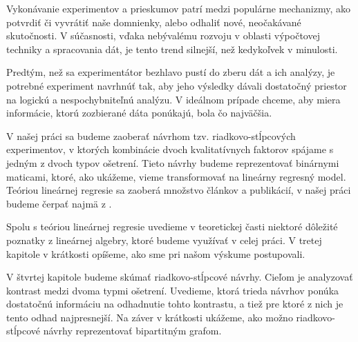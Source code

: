 Vykonávanie experimentov a prieskumov patrí medzi populárne mechanizmy, ako potvrdiť či vyvrátiť naše domnienky, alebo odhaliť nové, neočakávané skutočnosti. 
V súčasnosti, vďaka nebývalému rozvoju v oblasti výpočtovej techniky a spracovania dát, je tento trend silnejší, než kedykoľvek v minulosti.

Predtým, než sa experimentátor bezhlavo pustí do zberu dát a ich analýzy, je potrebné experiment navrhnúť tak, aby jeho výsledky dávali dostatočný priestor na 
logickú a nespochybniteľnú analýzu. V ideálnom prípade chceme, aby miera informácie, ktorú zozbierané dáta ponúkajú, bola čo najväčšia.

V našej práci sa budeme zaoberať návrhom tzv. riadkovo-stĺpcových experimentov, v ktorých kombinácie dvoch kvalitatívnych faktorov spájame s jedným z dvoch typov ošetrení. 
Tieto návrhy budeme reprezentovať binárnymi maticami, ktoré, ako ukážeme, vieme transformovať na lineárny regresný model. 
Teóriou lineárnej regresie sa zaoberá množstvo článkov a publikácií, v našej práci budeme čerpať najmä z \cite{pazman, yan}.

Spolu s teóriou lineárnej regresie uvedieme v teoretickej časti niektoré dôležité poznatky z lineárnej algebry, ktoré budeme využívať v celej práci. 
V tretej kapitole v krátkosti opíšeme, ako sme pri našom výskume postupovali.

V štvrtej kapitole budeme skúmať riadkovo-stĺpcové návrhy. Cieľom je analyzovať kontrast medzi dvoma typmi ošetrení. 
Uvedieme, ktorá trieda návrhov ponúka dostatočnú informáciu na odhadnutie tohto kontrastu, a tiež pre ktoré z nich je tento odhad najpresnejší. 
Na záver v krátkosti ukážeme, ako možno riadkovo-stĺpcové návrhy reprezentovať bipartitným grafom.